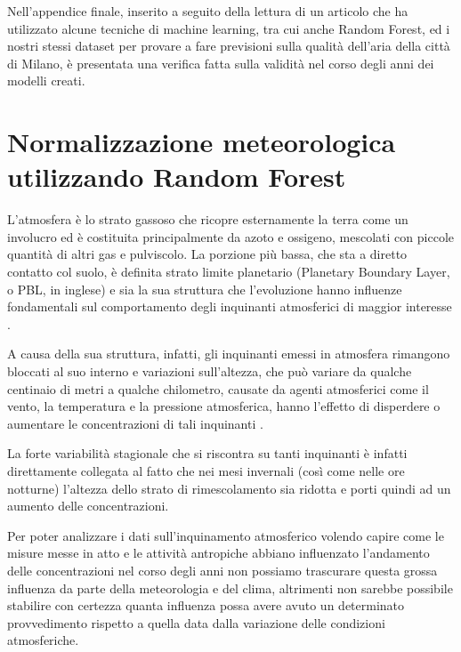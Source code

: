 \documentclass[a4paper]{report}
\begin{document}
Nell'appendice finale, inserito a seguito della lettura di un articolo \cite{app10134587} che ha utilizzato alcune tecniche di machine learning, tra cui anche Random Forest, ed i nostri stessi dataset per provare a fare previsioni sulla qualità dell'aria della città di Milano, è presentata una verifica fatta sulla validità nel corso degli anni dei modelli creati.


\chapter{Normalizzazione meteorologica utilizzando Random Forest}
L'atmosfera è lo strato gassoso che ricopre esternamente la terra come un involucro ed è costituita principalmente da azoto e ossigeno, mescolati con piccole quantità di altri gas e pulviscolo. La porzione più bassa, che sta a diretto contatto col suolo, è definita strato limite planetario (Planetary Boundary Layer, o PBL, in inglese) e sia la sua struttura che l'evoluzione hanno influenze fondamentali sul comportamento degli inquinanti atmosferici di maggior interesse \cite{dina2009concentrazione}.  

A causa della sua struttura, infatti, gli inquinanti emessi in atmosfera rimangono bloccati al suo interno e variazioni sull'altezza, che può variare da qualche centinaio di metri a qualche chilometro, causate da agenti atmosferici come il vento, la temperatura e la pressione atmosferica, hanno l'effetto di disperdere o aumentare le concentrazioni di tali inquinanti \cite{stull2012introduction}.  

La forte variabilità stagionale che si riscontra su tanti inquinanti è infatti direttamente collegata al fatto che nei mesi invernali (così come nelle ore notturne) l'altezza dello strato di rimescolamento sia ridotta e porti quindi ad un aumento delle concentrazioni.  

Per poter analizzare i dati sull'inquinamento atmosferico volendo capire come le misure messe in atto e le attività antropiche abbiano influenzato l'andamento delle concentrazioni nel corso degli anni non possiamo trascurare questa grossa influenza da parte della meteorologia e del clima, altrimenti non sarebbe possibile stabilire con certezza quanta influenza possa avere avuto un determinato provvedimento rispetto a quella data dalla variazione delle condizioni atmosferiche.  
\end{document}
